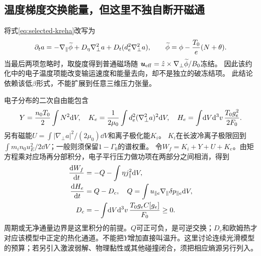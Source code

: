 \documentclass[UTF8,a4paper,11pt,openany,fontset=fandol]{ctexbook}
\begin{document}
\subsection{温度梯度交换能量，但这里不独自断开磁通}
将式\eqref{eq:selected-kreha}改写为
\begin{equation}
 \partial_ta=-\nabla_\parallel\widetilde\phi
 +D_\eta\nabla_\perp^2a+D_t(d_e^2\nabla_\perp^2a),\qquad
 \widetilde\phi=\phi-{T_0\over e}(N+\theta).
\end{equation}
当最后两项忽略时，取旋度得到普通磁场随
$\bm{u}_{\rm eff}=\hat z\times\nabla_\perp\widetilde\phi/B_0$冻结。
因此该约化中的电子温度项能改变输运速度和能量去向，却不是独立的破冻结项。
此结论依赖该低$\beta$形式，不能扩展到任意三维压力张量。

电子分布的二次自由能包含
\begin{equation}
 Y={n_0T_0\over2}\int N^2\mathrm d V,\quad
 K_e={1\over2\mu_0}\int d_e^2(\nabla_\perp^2a)^2\mathrm d V,\quad
 H_e=\int\!\mathrm d V\mathrm d^3v\,{T_0g_e^2\over2F_0}.
\end{equation}
另有磁能$U=\int|\nabla_\perp a|^2/(2\mu_0)\dd V$和离子极化能$K_i$。
$K_i$在长波冷离子极限回到$\int m_in_0u_E^2/2\dd V$；一般则须保留$1-\Gamma_0$的谱权重。
令$W_f=K_i+Y+U+K_e$。由矩方程乘对应场再分部积分，电子平行压力做功项在两部分之间相消，得到
\begin{align}
 {\mathrm dW_f\over\mathrm dt}&=-Q-\int\eta j_\parallel^2\mathrm d V,\\
 {\mathrm d H_e\over\mathrm d t}&=Q-D_c,\quad
 Q=\int u_{\parallel e}\nabla_\parallel\delta p_{\parallel e}\mathrm d V,\\
 D_c&=-\int\!\mathrm d V\mathrm d^3v\,{T_0g_eC[g_e]\over F_0}\ge0.
 \label{eq:selected-heating}
\end{align}
周期或无净通量边界是这里积分的前提。$Q$可正可负，是可逆交换；$D_c$和欧姆热才对应该模型中正定的热化通道。不能把$Y$增加直接叫温升。这里讨论连续光滑模型的预算；若另引入激波弱解、物理黏性或其他碰撞闭合，须把相应熵源另行列入。
\end{document}

